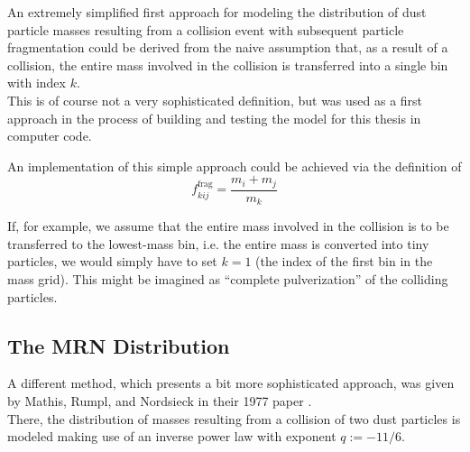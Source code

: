         An extremely simplified first approach for modeling the distribution of dust particle
        masses resulting from a collision event with subsequent particle fragmentation could 
        be derived from the
        naive assumption that, as a result of a collision, the entire mass involved in the
        collision is transferred into a single bin with index $k$. \\

        This is of course not a very sophisticated definition, but was used as a first 
        approach in the process of building and testing the model for this thesis in 
        computer code.

        \clearpage

        An implementation of this simple approach could be achieved via the definition of
        \begin{equation}
            f^\text{frag}_{kij} = \frac{m_i + m_j}{m_k}
        \end{equation}

        If, for example, we assume that the entire mass involved in the collision is to be
        transferred to the lowest-mass bin, i.e. the entire mass is converted into tiny particles,
        we would simply have to set $k=1$ (the index of the first bin in the mass grid).
        This might be imagined as ``complete pulverization'' of the colliding particles.



    \subsection{The MRN Distribution}
    \label{sec:the_mrn_distribution}
        
        A different method, which presents a bit more sophisticated approach, was given by 
        Mathis, Rumpl, and Nordsieck in their 1977 paper \cite{mathis_rumpl_nordsieck_1977}. \\

        There, the distribution of masses resulting from a collision of two dust particles 
        is modeled making use of an inverse power law with exponent $q := - 11/6$. \\

